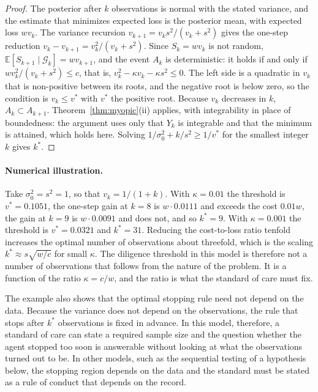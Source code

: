 \documentclass[11pt]{article}
\newcommand{\G}{\mathcal G}
\newcommand{\E}{\mathbb E}
\theoremstyle{plain}
\theoremstyle{definition}
\begin{document}
\begin{proof}
The posterior after $k$ observations is normal with the stated variance, and the estimate that minimizes expected loss is the posterior mean, with expected loss $wv_k$. The variance recursion $v_{k+1}=v_ks^2/(v_k+s^2)$ gives the one-step reduction $v_k-v_{k+1}=v_k^2/(v_k+s^2)$. Since $S_k=wv_k$ is not random, $\E[S_{k+1}\mid\G_k]=wv_{k+1}$, and the event $A_k$ is deterministic: it holds if and only if $wv_k^2/(v_k+s^2)\le c$, that is, $v_k^2-\kappa v_k-\kappa s^2\le0$. The left side is a quadratic in $v_k$ that is non-positive between its roots, and the negative root is below zero, so the condition is $v_k\le v^*$ with $v^*$ the positive root. Because $v_k$ decreases in $k$, $A_k\subset A_{k+1}$. Theorem~\ref{thm:myopic}(ii) applies, with integrability in place of boundedness: the argument uses only that $Y_k$ is integrable and that the minimum is attained, which holds here. Solving $1/\sigma_0^2+k/s^2\ge1/v^*$ for the smallest integer $k$ gives $k^*$.
\end{proof}

\paragraph{Numerical illustration.} Take $\sigma_0^2=s^2=1$, so that $v_k=1/(1+k)$. With $\kappa=0.01$ the threshold is $v^*=0.1051$, the one-step gain at $k=8$ is $w\cdot0.0111$ and exceeds the cost $0.01w$, the gain at $k=9$ is $w\cdot0.0091$ and does not, and so $k^*=9$. With $\kappa=0.001$ the threshold is $v^*=0.0321$ and $k^*=31$. Reducing the cost-to-loss ratio tenfold increases the optimal number of observations about threefold, which is the scaling $k^*\approx s\sqrt{w/c}$ for small $\kappa$. The diligence threshold in this model is therefore not a number of observations that follows from the nature of the problem. It is a function of the ratio $\kappa=c/w$, and the ratio is what the standard of care must fix.

The example also shows that the optimal stopping rule need not depend on the data. Because the variance does not depend on the observations, the rule that stops after $k^*$ observations is fixed in advance. In this model, therefore, a standard of care can state a required sample size and the question whether the agent stopped too soon is answerable without looking at what the observations turned out to be. In other models, such as the sequential testing of a hypothesis below, the stopping region depends on the data and the standard must be stated as a rule of conduct that depends on the record.
\end{document}

